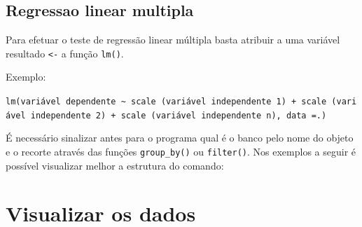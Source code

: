 \documentclass[
  brazil,
]{book}
\newenvironment{Shaded}{\begin{snugshade}}{\end{snugshade}}
\newcommand{\CommentTok}[1]{\textcolor[rgb]{0.56,0.35,0.01}{\textit{#1}}}
\newcommand{\DataTypeTok}[1]{\textcolor[rgb]{0.13,0.29,0.53}{#1}}
\newcommand{\DecValTok}[1]{\textcolor[rgb]{0.00,0.00,0.81}{#1}}
\newcommand{\KeywordTok}[1]{\textcolor[rgb]{0.13,0.29,0.53}{\textbf{#1}}}
\newcommand{\NormalTok}[1]{#1}
\newcommand{\OperatorTok}[1]{\textcolor[rgb]{0.81,0.36,0.00}{\textbf{#1}}}
\newcommand{\StringTok}[1]{\textcolor[rgb]{0.31,0.60,0.02}{#1}}
\begin{document}
\hypertarget{regressao-linear-multipla}{%
\section{Regressao linear multipla}\label{regressao-linear-multipla}}

Para efetuar o teste de regressão linear múltipla basta atribuir a uma variável resultado \texttt{\textless{}-} a função \texttt{lm()}.

Exemplo:

\texttt{lm(variável\ dependente\ \textasciitilde{}\ scale\ (variável\ independente\ 1)\ +\ scale\ (variável\ independente\ 2)\ +\ scale\ (variável\ independente\ n),\ data\ =.)}

É necessário sinalizar antes para o programa qual é o banco pelo nome do objeto e o recorte através das funções \texttt{group\_by()} ou \texttt{filter()}. Nos exemplos a seguir é possível visualizar melhor a estrutura do comando:

\begin{Shaded}
\end{Shaded}

\hypertarget{visualizar-os-dados}{%
\chapter{Visualizar os dados}\label{visualizar-os-dados}}
\end{document}
